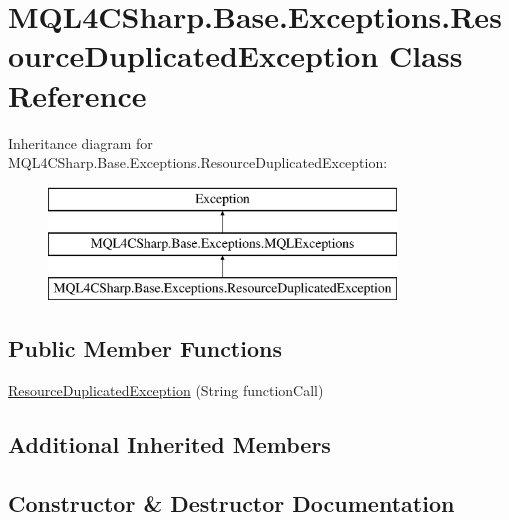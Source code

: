 \hypertarget{class_m_q_l4_c_sharp_1_1_base_1_1_exceptions_1_1_resource_duplicated_exception}{}\section{M\+Q\+L4\+C\+Sharp.\+Base.\+Exceptions.\+Resource\+Duplicated\+Exception Class Reference}
\label{class_m_q_l4_c_sharp_1_1_base_1_1_exceptions_1_1_resource_duplicated_exception}
Inheritance diagram for M\+Q\+L4\+C\+Sharp.\+Base.\+Exceptions.\+Resource\+Duplicated\+Exception\+:\begin{figure}[H]
\begin{center}
\leavevmode
\includegraphics[height=3.000000cm]{class_m_q_l4_c_sharp_1_1_base_1_1_exceptions_1_1_resource_duplicated_exception}
\end{center}
\end{figure}
\subsection*{Public Member Functions}
\begin{DoxyCompactItemize}
\item 
\hyperlink{class_m_q_l4_c_sharp_1_1_base_1_1_exceptions_1_1_resource_duplicated_exception_a4615ce220fe9e83d7e0a174e81464716}{Resource\+Duplicated\+Exception} (String function\+Call)
\end{DoxyCompactItemize}
\subsection*{Additional Inherited Members}


\subsection{Constructor \& Destructor Documentation}
